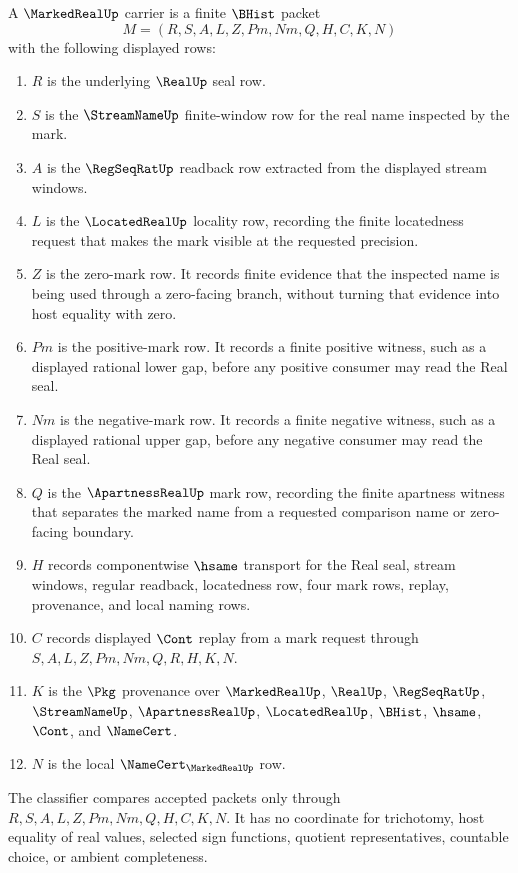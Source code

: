 \begin{definition}
\label{def:marked-real-carrier}
A $\MarkedRealUp$ carrier is a finite $\BHist$ packet
$$
M=(R,S,A,L,Z,Pm,Nm,Q,H,C,K,N)
$$
with the following displayed rows:
\begin{enumerate}
\item $R$ is the underlying $\RealUp$ seal row.
\item $S$ is the $\StreamNameUp$ finite-window row for the real name inspected by the mark.
\item $A$ is the $\RegSeqRatUp$ readback row extracted from the displayed stream windows.
\item $L$ is the $\LocatedRealUp$ locality row, recording the finite locatedness request that makes the mark visible at the requested precision.
\item $Z$ is the zero-mark row. It records finite evidence that the inspected name is being used through a zero-facing branch, without turning that evidence into host equality with zero.
\item $Pm$ is the positive-mark row. It records a finite positive witness, such as a displayed rational lower gap, before any positive consumer may read the Real seal.
\item $Nm$ is the negative-mark row. It records a finite negative witness, such as a displayed rational upper gap, before any negative consumer may read the Real seal.
\item $Q$ is the $\ApartnessRealUp$ mark row, recording the finite apartness witness that separates the marked name from a requested comparison name or zero-facing boundary.
\item $H$ records componentwise $\hsame$ transport for the Real seal, stream windows, regular readback, locatedness row, four mark rows, replay, provenance, and local naming rows.
\item $C$ records displayed $\Cont$ replay from a mark request through $S,A,L,Z,Pm,Nm,Q,R,H,K,N$.
\item $K$ is the $\Pkg$ provenance over $\MarkedRealUp$, $\RealUp$, $\RegSeqRatUp$, $\StreamNameUp$, $\ApartnessRealUp$, $\LocatedRealUp$, $\BHist$, $\hsame$, $\Cont$, and $\NameCert$.
\item $N$ is the local $\NameCert_{\MarkedRealUp}$ row.
\end{enumerate}
The classifier compares accepted packets only through $R,S,A,L,Z,Pm,Nm,Q,H,C,K,N$. It has no coordinate for trichotomy, host equality of real values, selected sign functions, quotient representatives, countable choice, or ambient completeness.
\end{definition}

